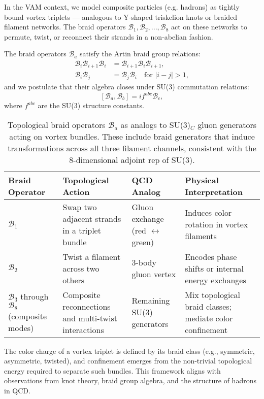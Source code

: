 In the VAM context, we model composite particles (e.g. hadrons) as tightly bound vortex triplets — analogous to Y-shaped triskelion knots or braided filament networks. The braid operators $\mathcal{B}_1, \mathcal{B}_2, ..., \mathcal{B}_8$ act on these networks to permute, twist, or reconnect their strands in a non-abelian fashion.

The braid operators $\mathcal{B}_a$ satisfy the Artin braid group relations:
\[
\begin{aligned}
\mathcal{B}_i \mathcal{B}_{i+1} \mathcal{B}_i &= \mathcal{B}_{i+1} \mathcal{B}_i \mathcal{B}_{i+1}, \\
\mathcal{B}_i \mathcal{B}_j &= \mathcal{B}_j \mathcal{B}_i \quad \text{for } |i - j| > 1,
\end{aligned}
\]
and we postulate that their algebra closes under SU(3) commutation relations:
\[
[\mathcal{B}_a, \mathcal{B}_b] = i f^{abc} \mathcal{B}_c,
\]
where $f^{abc}$ are the SU(3) structure constants.

\begin{table}[H]
    \centering
    \footnotesize
    \renewcommand{\arraystretch}{1.4}
    \begin{tabular}{|l|l|l|l|}
        \hline
        \textbf{Braid Operator} & \textbf{Topological Action} & \textbf{QCD Analog} & \textbf{Physical Interpretation} \\
        \hline
        $\mathcal{B}_1$ & Swap two adjacent strands in a triplet bundle & Gluon exchange (red $\leftrightarrow$ green) & Induces color rotation in vortex filaments \\
        \hline
        $\mathcal{B}_2$ & Twist a filament across two others & 3-body gluon vertex & Encodes phase shifts or internal energy exchanges \\
        \hline
        $\mathcal{B}_3$ through $\mathcal{B}_8$ (composite modes)& Composite reconnections and multi-twist interactions & Remaining SU(3) generators & Mix topological braid classes; mediate color confinement \\
        \hline
    \end{tabular}
    \caption{Topological braid operators $\mathcal{B}_a$ as analogs to SU(3)$_C$ gluon generators acting on vortex bundles. These include braid generators that induce transformations across all three filament channels, consistent with the 8-dimensional adjoint rep of SU(3).}
\end{table}

The color charge of a vortex triplet is defined by its braid class (e.g., symmetric, asymmetric, twisted), and confinement emerges from the non-trivial topological energy required to separate such bundles. This framework aligns with observations from knot theory, braid group algebra, and the structure of hadrons in QCD.


